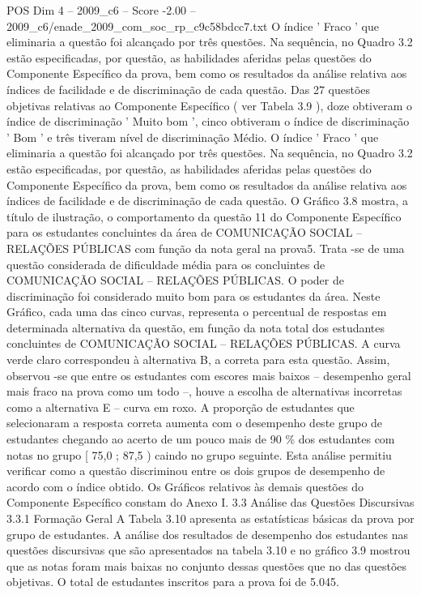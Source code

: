 \begin{textsample}{POS Dim 4 – 2009\_c6 – Score -2.00 – 2009\_c6/enade\_2009\_com\_soc\_rp\_c9c58bdcc7.txt}
O índice ' Fraco ' que eliminaria a questão foi alcançado por três questões.
Na sequência, no Quadro 3.2 estão especificadas, por questão, as habilidades aferidas pelas questões do Componente Específico da prova, bem como os resultados da análise relativa aos índices de facilidade e de discriminação de cada questão.
Das 27 questões objetivas relativas ao Componente Específico ( ver Tabela 3.9 ), doze obtiveram o índice de discriminação ' Muito bom ', cinco obtiveram o índice de discriminação ' Bom ' e três tiveram nível de discriminação Médio.
O índice ' Fraco ' que eliminaria a questão foi alcançado por três questões.
Na sequência, no Quadro 3.2 estão especificadas, por questão, as habilidades aferidas pelas questões do Componente Específico da prova, bem como os resultados da análise relativa aos índices de facilidade e de discriminação de cada questão.
O Gráfico 3.8 mostra, a título de ilustração, o comportamento da questão 11 do Componente Específico para os estudantes concluintes da área de COMUNICAÇÃO SOCIAL – RELAÇÕES PÚBLICAS com função da nota geral na prova5.
Trata -se de uma questão considerada de dificuldade média para os concluintes de COMUNICAÇÃO SOCIAL – RELAÇÕES PÚBLICAS.
O poder de discriminação foi considerado muito bom para os estudantes da área.
Neste Gráfico, cada uma das cinco curvas, representa o percentual de respostas em determinada alternativa da questão, em função da nota total dos estudantes concluintes de COMUNICAÇÃO SOCIAL – RELAÇÕES PÚBLICAS.
A curva verde claro correspondeu à alternativa B, a correta para esta questão.
Assim, observou -se que entre os estudantes com escores mais baixos – desempenho geral mais fraco na prova como um todo –, houve a escolha de alternativas incorretas como a alternativa E – curva em roxo.
A proporção de estudantes que selecionaram a resposta correta aumenta com o desempenho deste grupo de estudantes chegando ao acerto de um pouco mais de 90 \% dos estudantes com notas no grupo [ 75,0 ; 87,5 ) caindo no grupo seguinte.
Esta análise permitiu verificar como a questão discriminou entre os dois grupos de desempenho de acordo com o índice obtido.
Os Gráficos relativos às demais questões do Componente Específico constam do Anexo I. 3.3 Análise das Questões Discursivas 3.3.1 Formação Geral A Tabela 3.10 apresenta as estatísticas básicas da prova por grupo de estudantes.
A análise dos resultados de desempenho dos estudantes nas questões discursivas que são apresentados na tabela 3.10 e no gráfico 3.9 mostrou que as notas foram mais baixas no conjunto dessas questões que no das questões objetivas.
O total de estudantes inscritos para a prova foi de 5.045.

\end{textsample}
